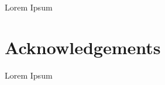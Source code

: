 \documentclass[a4paper]{article}
\begin{document}
Lorem Ipsum

\section{Acknowledgements}

Lorem Ipsum






\end{document}
